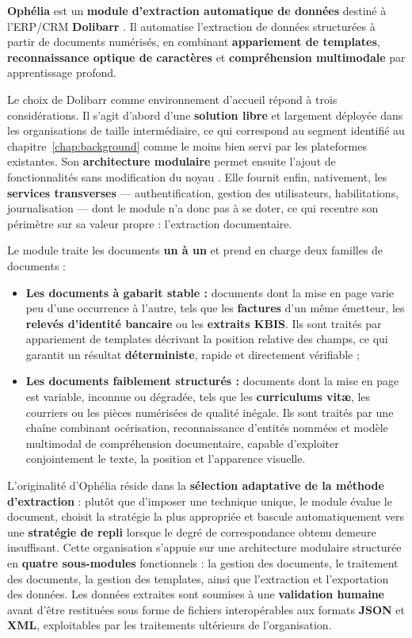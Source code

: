 \textbf{Ophélia} est un \textbf{module d'extraction automatique de données} destiné à
l'ERP/CRM \textbf{Dolibarr} \cite{dolibarr2025doc}. Il automatise l'extraction de données
structurées à partir de documents numérisés, en combinant \textbf{appariement de templates},
\textbf{reconnaissance optique de caractères} et \textbf{compréhension multimodale} par
apprentissage profond.

Le choix de Dolibarr comme environnement d'accueil répond à trois considérations. Il s'agit
d'abord d'une \textbf{solution libre} et largement déployée dans les organisations de taille
intermédiaire, ce qui correspond au segment identifié au chapitre~\ref{chap:background} comme
le moins bien servi par les plateformes existantes. Son \textbf{architecture modulaire}
permet ensuite l'ajout de fonctionnalités sans modification du noyau
\cite{dolibarr2025devguide}. Elle fournit enfin, nativement, les \textbf{services transverses}
— authentification, gestion des utilisateurs, habilitations, journalisation — dont le module
n'a donc pas à se doter, ce qui recentre son périmètre sur sa valeur propre : l'extraction
documentaire.

Le module traite les documents \textbf{un à un} et prend en charge deux familles de
documents :

\begin{itemize}
    \item[\opmanicule] \textbf{Les documents à gabarit stable :} documents dont la mise en
    page varie peu d'une occurrence à l'autre, tels que les \textbf{factures} d'un même
    émetteur, les \textbf{relevés d'identité bancaire} ou les \textbf{extraits KBIS}. Ils sont
    traités par appariement de templates décrivant la position relative des champs, ce qui
    garantit un résultat \textbf{déterministe}, rapide et directement vérifiable ;

    \item[\opmanicule] \textbf{Les documents faiblement structurés :} documents dont la mise
    en page est variable, inconnue ou dégradée, tels que les \textbf{curriculums vit{\ae}},
    les courriers ou les pièces numérisées de qualité inégale. Ils sont traités par une chaîne
    combinant océrisation, reconnaissance d'entités nommées et modèle multimodal de
    compréhension documentaire, capable d'exploiter conjointement le texte, la position et
    l'apparence visuelle.
\end{itemize}

L'originalité d'Ophélia réside dans la \textbf{sélection adaptative de la méthode
d'extraction} : plutôt que d'imposer une technique unique, le module évalue le document,
choisit la stratégie la plus appropriée et bascule automatiquement vers une \textbf{stratégie
de repli} lorsque le degré de correspondance obtenu demeure insuffisant. Cette organisation
s'appuie sur une architecture modulaire structurée en \textbf{quatre sous-modules}
fonctionnels : la gestion des documents, le traitement des documents, la gestion des
templates, ainsi que l'extraction et l'exportation des données. Les données extraites sont
soumises à une \textbf{validation humaine} avant d'être restituées sous forme de fichiers
interopérables aux formats \textbf{JSON} et \textbf{XML}, exploitables par les traitements
ultérieurs de l'organisation.

